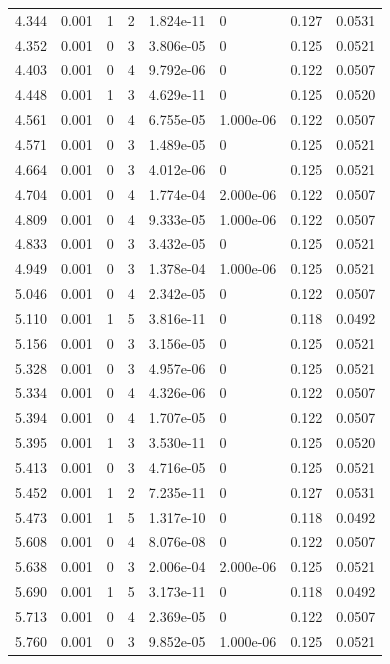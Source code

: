 \documentclass[preview]{standalone}
\begin{document}
{{{\begin{tabular}{L{1.2cm}C{1.2cm} C{0.3cm}C{0.5cm} C{1.4cm}C{1.4cm} C{1.4cm}C{1.4cm}}
  4.344  &  0.001  & 1     &  2 &  1.824e-11  & 0  & 0.127 &  0.0531   \\ 
  4.352  &  0.001  & 0     &  3 &  3.806e-05  & 0  & 0.125 &  0.0521   \\ 
  4.403  &  0.001  & 0     &  4 &  9.792e-06  & 0  & 0.122 &  0.0507   \\ 
  4.448  &  0.001  & 1     &  3 &  4.629e-11  & 0  & 0.125 &  0.0520   \\ 
  4.561  &  0.001  & 0     &  4 &  6.755e-05  & 1.000e-06  & 0.122 &  0.0507   \\ 
  4.571  &  0.001  & 0     &  3 &  1.489e-05  & 0  & 0.125 &  0.0521   \\ 
  4.664  &  0.001  & 0     &  3 &  4.012e-06  & 0  & 0.125 &  0.0521   \\ 
  4.704  &  0.001  & 0     &  4 &  1.774e-04  & 2.000e-06  & 0.122 &  0.0507   \\ 
  4.809  &  0.001  & 0     &  4 &  9.333e-05  & 1.000e-06  & 0.122 &  0.0507   \\ 
  4.833  &  0.001  & 0     &  3 &  3.432e-05  & 0  & 0.125 &  0.0521   \\ 
  4.949  &  0.001  & 0     &  3 &  1.378e-04  & 1.000e-06  & 0.125 &  0.0521   \\ 
  5.046  &  0.001  & 0     &  4 &  2.342e-05  & 0  & 0.122 &  0.0507   \\ 
  5.110  &  0.001  & 1     &  5 &  3.816e-11  & 0  & 0.118 &  0.0492   \\ 
  5.156  &  0.001  & 0     &  3 &  3.156e-05  & 0  & 0.125 &  0.0521   \\ 
  5.328  &  0.001  & 0     &  3 &  4.957e-06  & 0  & 0.125 &  0.0521   \\ 
  5.334  &  0.001  & 0     &  4 &  4.326e-06  & 0  & 0.122 &  0.0507   \\ 
  5.394  &  0.001  & 0     &  4 &  1.707e-05  & 0  & 0.122 &  0.0507   \\ 
  5.395  &  0.001  & 1     &  3 &  3.530e-11  & 0  & 0.125 &  0.0520   \\ 
  5.413  &  0.001  & 0     &  3 &  4.716e-05  & 0  & 0.125 &  0.0521   \\ 
  5.452  &  0.001  & 1     &  2 &  7.235e-11  & 0  & 0.127 &  0.0531   \\ 
  5.473  &  0.001  & 1     &  5 &  1.317e-10  & 0  & 0.118 &  0.0492   \\ 
  5.608  &  0.001  & 0     &  4 &  8.076e-08  & 0  & 0.122 &  0.0507   \\ 
  5.638  &  0.001  & 0     &  3 &  2.006e-04  & 2.000e-06  & 0.125 &  0.0521   \\ 
  5.690  &  0.001  & 1     &  5 &  3.173e-11  & 0  & 0.118 &  0.0492   \\ 
  5.713  &  0.001  & 0     &  4 &  2.369e-05  & 0  & 0.122 &  0.0507   \\ 
  5.760  &  0.001  & 0     &  3 &  9.852e-05  & 1.000e-06  & 0.125 &  0.0521   \\ 
\hline 
\end{tabular} 

}}}
\end{document}
